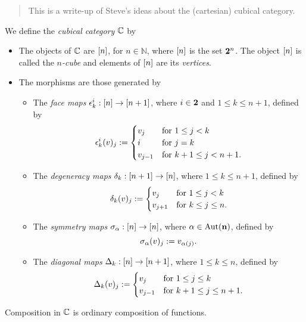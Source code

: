 \documentclass{article}
\begin{document}
\begin{abstract}
This is a write-up of Steve's ideas about the (cartesian) cubical category.
\end{abstract}

\begin{defn}
We define the \emph{cubical category} $\mathbb{C}$ by
\begin{itemize}
\item The objects of $\mathbb{C}$ are $[n]$, for $n\in\mathbb{N}$, where $[n]$ is the set $\mathbf{2}^n$. The object $[n]$ is called the \emph{$n$-cube} and elements of $[n]$ are its \emph{vertices}.
\item The morphisms are those generated by
\begin{itemize}
\item The \emph{face maps} $\epsilon_{k}^{i}:[n]\to[n+1]$, where $i\in \mathbf{2}$ and
$1\leq k\leq n+1$, defined by
\begin{equation*}
\epsilon_{k}^{i}(v)_j :=
\begin{cases}
v_j & \text{for }1\leq j<k\\
i & \text{for }j=k\\
v_{j-1} & \text{for }k+1\leq j<n+1.
\end{cases}
\end{equation*}
\item The \emph{degeneracy maps} $\delta_{k}:[n+1]\to[n]$, where
$1\leq k\leq n+1$, defined by
\begin{equation*}
\delta_{k}(v)_{j} :=
\begin{cases}
v_{j} & \text{for }1\leq j<k\\
v_{j+1} & \text{for }k\leq j\leq n.
\end{cases}
\end{equation*}
\item The \emph{symmetry maps} $\sigma_{\alpha}:[n]\to[n]$, where
$\alpha\in\mathrm{Aut}(\mathbf{n})$, defined by
\begin{equation*}
\sigma_{\alpha}(v)_{j}:= v_{\alpha(j)}.
\end{equation*}
\item The \emph{diagonal maps} $\Delta_{k}:[n]\to[n+1]$, where
$1\leq k\leq n$, defined by
\begin{equation*}
\Delta_{k}(v)_{j} :=
\begin{cases}
v_{j} & \text{for }1\leq j\leq k\\
v_{j-1} & \text{for }k+1\leq j\leq n+1.
\end{cases}
\end{equation*}
\end{itemize}
\end{itemize}
Composition in $\mathbb{C}$ is ordinary composition of functions.
\end{defn}
\end{document}
